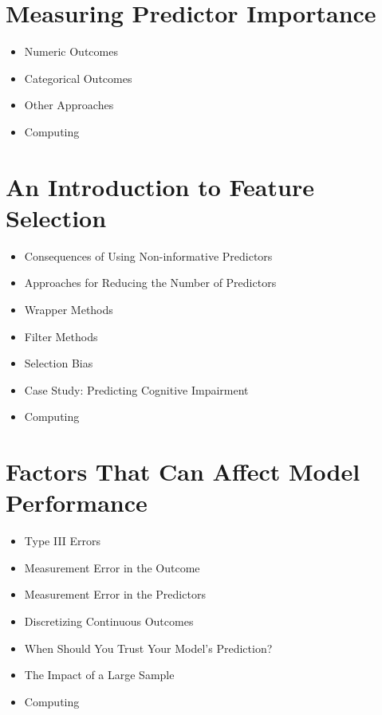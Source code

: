 \section{Measuring Predictor Importance} 
\begin{itemize}  
\item Numeric Outcomes  
\item Categorical Outcomes 
\item Other Approaches  
\item Computing 
\end{itemize} 
\section{An Introduction to Feature Selection}  
\begin{itemize}
\item Consequences of Using Non-informative Predictors 
\item Approaches for Reducing the Number of Predictors 
\item Wrapper Methods  
\item Filter Methods 
\item Selection Bias 
\item Case Study: Predicting Cognitive Impairment  
\item Computing 
\end{itemize} 
\section{Factors That Can Affect Model Performance}  
\begin{itemize}
\item Type III Errors 
\item Measurement Error in the Outcome  
\item Measurement Error in the Predictors  
\item Discretizing Continuous Outcomes 
\item When Should You Trust Your Model’s Prediction? 
\item The Impact of a Large Sample 
\item Computing 
\end{itemize} 
